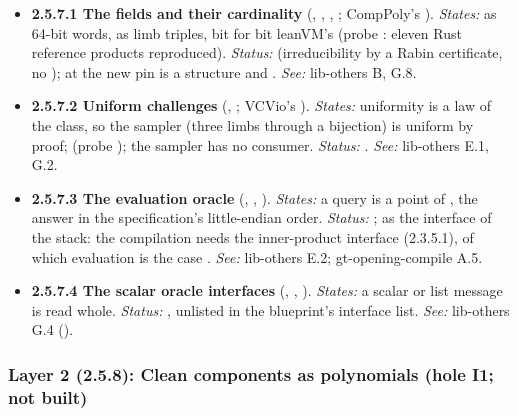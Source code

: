 \begin{itemize}[label={}, leftmargin=1.3em, itemindent=-1.3em, labelwidth=0pt, labelsep=0pt, itemsep=4pt, topsep=3pt]
\item {}\label{obl:node-2.5.7.1}\textbf{2.5.7.1 The fields and their cardinality} (, , , ; CompPoly's ). \emph{States:}  as 64-bit words,  as limb triples, bit for bit leanVM's (probe : eleven Rust reference products reproduced). \emph{Status:}  (irreducibility by a Rabin certificate, no ); at the new pin  is a structure and . \emph{See:} lib-others B, G.8.
\item {}\label{obl:node-2.5.7.2}\textbf{2.5.7.2 Uniform challenges} (, ; VCVio's ). \emph{States:} uniformity is a law of the class, so the  sampler (three limbs through a bijection) is uniform by proof;  (probe ); the  sampler has no consumer. \emph{Status:} . \emph{See:} lib-others E.1, G.2.
\item {}\label{obl:node-2.5.7.3}\oblflag\textbf{2.5.7.3 The evaluation oracle} (, , ). \emph{States:} a query is a point of , the answer  in the specification's little-endian order. \emph{Status:} ;  as the interface of the stack: the compilation needs the inner-product interface (2.3.5.1), of which evaluation is the case . \emph{See:} lib-others E.2; gt-opening-compile A.5.
\item {}\label{obl:node-2.5.7.4}\textbf{2.5.7.4 The scalar oracle interfaces} (, , ). \emph{States:} a scalar or list message is read whole. \emph{Status:}  , unlisted in the blueprint's interface list. \emph{See:} lib-others G.4 ().
\end{itemize}

\subsubsection[Layer 2 (2.5.8)]{Layer 2 (2.5.8): Clean components as polynomials (hole I1; not built)}\label{sec:obl-gen-layer2}

